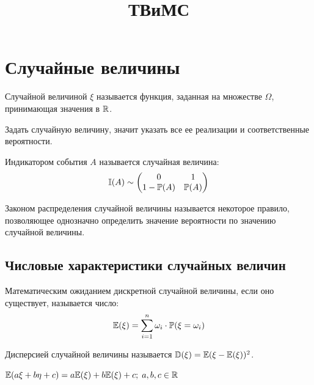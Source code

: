 \documentclass[12pt]{article}
\title{\textbf{ТВиМС}}\date{}\author{}
\begin{document}
\maketitle
\tableofcontents
\label{toc}
\newpage

\section{Случайные величины}

\begin{definition}
    Случайной величиной $\xi$ называется функция, заданная на множестве $\Omega$, принимающая значения в $\mathbb{R}$.
\end{definition}

    Задать случайную величину, значит указать все ее реализации и соответственные вероятности.

\begin{definition}
    Индикатором события $A$ называется случайная величина:
    $$\mathbb{I}(A)\sim \begin{pmatrix}
        0 & 1\\
        1-\mathbb{P}(A) & \mathbb{P}(A)
    \end{pmatrix}$$
\end{definition}

\begin{definition}
    Законом распределения случайной величины называется некоторое правило, позволяющее однозначно определить значение вероятности по значению случайной величины.
\end{definition}

    \subsection{Числовые характеристики случайных величин}

\begin{definition}
    Математическим ожиданием дискретной случайной величины, если оно существует, называется число: 
    $$\mathbb{E} (\xi)=\sum_{i=1}^{n}\omega_i\cdot \mathbb{P}(\xi=\omega_i)$$
\end{definition}

\begin{definition}
    Дисперсией случайной величины называется $\mathbb{D}(\xi)=\mathbb{E}(\xi-\mathbb{E}(\xi))^2$.
\end{definition}

\begin{theorem}
    $\mathbb{E}(a\xi+b\eta+c)=a\mathbb{E}(\xi)+b\mathbb{E}(\xi)+c;\;a,b,c\in \mathbb{R}$
\end{theorem}
\end{document}
